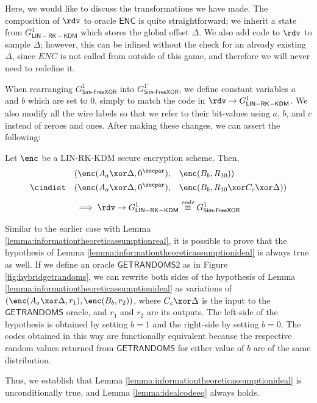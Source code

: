 Here, we would like to discuss the transformations we have made. The composition of $\rdv$ to oracle $\mathsf{ENC}$ is quite straightforward; we inherit a state from $G^{1}_{\mathsf{LIN-RK-KDM}}$ which stores the global offset $\Delta$. We also add code to $\rdv$ to sample $\Delta$; however, this can be inlined without the check for an already existing $\Delta$, since $ENC$ is not called from outside of this game, and therefore we will never need to redefine it. 


When rearranging $G^{1}_{\mathsf{Sim\text{-}FreeXOR}}$ into $G^{1\prime}_{\mathsf{Sim\text{-}FreeXOR}}$, we define constant variables $a$ and $b$ which are set to $0$, simply to match the code in $\rdv \to G^{1}_{\mathsf{LIN-RK-KDM}}$. We also modify all the wire labels so that we refer to their bit-values using $a$, $b$, and $c$ instead of zeroes and ones.
After making these changes, we can assert the following:
\begin{lemma}\label{lemma:informationtheoreticassumptionideal}
    Let $\enc$ be a LIN-RK-KDM secure encryption scheme. Then,
    \[
    \begin{aligned}
        &(\enc(A_{a}\xor\Delta, 0^\secpar),
        &&\enc(B_b, R_{10})) \\
        \cindist\quad &(\enc(A_{a}\xor\Delta, 0^\secpar),
        &&\enc(B_b, R_{10} \xor C_{c} \xor \Delta))
    \end{aligned}
    \]
    \[\implies \rdv\to G^{1}_{\mathsf{LIN-RK-KDM}} \codeequiv G^{1}_\mathsf{Sim\text{-}FreeXOR} \]
\end{lemma} 
Similar to the earlier case with Lemma \ref{lemma:informationtheoreticassumptionreal}, it is possible to prove that the hypothesis of Lemma \ref{lemma:informationtheoreticassumptionideal} is always true as well. If we define an oracle $\mathsf{GETRANDOMS2}$ as in Figure \ref{fig:hybridgetrandoms}, we can rewrite both sides of the hypothesis of Lemma \ref{lemma:informationtheoreticassumptionideal} as variations of $(\enc(A_{a}\xor \Delta, r_1), \enc(B_{b}, r_2))$, where $C_{c}\xor \Delta$ is the input to the $\mathsf{GETRANDOMS}$ oracle, and $r_1$ and $r_2$ are its outputs. The left-side of the hypothesis is obtained by setting $b=1$ and the right-side by setting $b=0$. The codes obtained in this way are functionally equivalent because the respective random values returned from $\mathsf{GETRANDOMS}$ for either value of $b$ are of the same distribution. 

Thus, we establish that Lemma \ref{lemma:informationtheoreticassumptionideal} is unconditionally true, and Lemma \ref{lemma:idealcodeeq} always holds.

